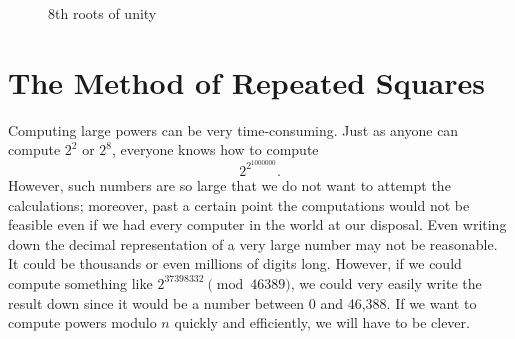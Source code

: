 \begin{figure}[hbt]
\begin{center}

\end{center}
\caption{8th roots of unity}
\label{rtsunity}
\end{figure}
 
 
 
 
\section[The Method of Repeated Squares]{The Method of Repeated
Squares\protect\footnotemark} 
 
 
Computing large powers can be very time-consuming. Just as anyone can
compute $2^2$ or $2^8$, everyone knows how to compute
\[
2^{2^{1000000} }.
\]
However, such numbers are so large that we do not want to attempt the
calculations; moreover, past a certain point the computations would not
be feasible even if we had every computer in the world at our
disposal. Even 
writing down the decimal representation of a very large number may not
be reasonable. It could be thousands or even millions of digits long.
However, if we could compute something like $2^{37398332 } \pmod{
46389}$, we could very easily write the result down since it would be a
number between 0 and 46,388. If we want to compute powers modulo $n$
quickly and efficiently, we will have to be clever. 
 
